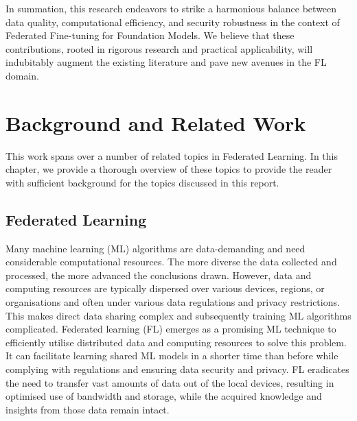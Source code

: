 \documentclass[withindex,glossary,firstyr]{cam-thesis}
\begin{document}
In summation, this research endeavors to strike a harmonious balance between data quality, computational efficiency, and security robustness in the context of Federated Fine-tuning for Foundation Models. We believe that these contributions, rooted in rigorous research and practical applicability, will indubitably augment the existing literature and pave new avenues in the FL domain.



\chapter{Background and Related Work} \label{Background}
This work spans over a number of related topics in Federated Learning. In this chapter, we provide a thorough overview of these topics to provide the reader with sufficient background for the topics discussed in this report.



\section{Federated Learning}
Many machine learning (ML) algorithms are data-demanding and need considerable computational resources. The more diverse the data collected and processed, the more advanced the conclusions drawn. However, data and computing resources are typically dispersed over various devices, regions, or organisations and often under various data regulations and privacy restrictions. This makes direct data sharing complex and subsequently training ML algorithms complicated. Federated learning (FL) emerges as a promising ML technique to efficiently utilise distributed data and computing resources to solve this problem. It can facilitate learning shared ML models in a shorter time than before while complying with regulations and ensuring data security and privacy. FL eradicates the need to transfer vast amounts of data out of the local devices, resulting in optimised use of bandwidth and storage, while the acquired knowledge and insights from those data remain intact.
\end{document}
